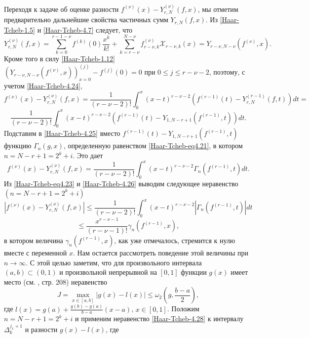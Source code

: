     Переходя к задаче об оценке разности $f^{(\nu)}(x)-Y_{r,N}^{(\nu)}(f,x)$, мы отметим предварительно  дальнейшие свойства    частичных сумм $Y_{r,N}(f,x)$. Из \eqref{Haar-Tcheb-1.5} и  \eqref{Haar-Tcheb-4.7} следует, что
\begin{equation}\label{Haar-Tcheb-4.24}
 Y_{r,N}^{(\nu)}(f,x)=\sum_{k=0}^{r-1-\nu} f^{(k)}(0)\frac{x^k}{k!}+ \sum_{k=r-\nu}^{N-\nu} f_{r-\nu,k}^{(\nu)}\mathcal{X}_{r-\nu,k}(x)=Y_{r-\nu,N-\nu}(f^{(\nu)},x).
 \end{equation}
 Кроме того в силу \eqref{Haar-Tcheb-1.12} $(Y_{r-\nu,N-\nu}(f^{(\nu)},x))^{(j)}_{x=0}-f^{(j)}(0)=0$ при  $0\le j\le r-\nu-2$,
 поэтому, с учетом \eqref{Haar-Tcheb-4.24},
 $$
f^{(\nu)}(x)-Y_{r,N}^{(\nu)}(f,x)= \frac{1}{(r-\nu-2)!}\int_0^x (x-t)^{r-\nu-2}(f^{(r-1)}(t)-Y_{r,N}^{(r-1)}(f,t))dt=
$$
  \begin{equation}\label{Haar-Tcheb-4.25}
\frac{1}{(r-\nu-2)!}\int_0^x (x-t)^{r-\nu-2}(f^{(r-1)}(t)-Y_{1,N-r+1}(f^{(r-1)},t))dt.
 \end{equation}
Подставим в \eqref{Haar-Tcheb-4.25} вместо $f^{(r-1)}(t)-Y_{1,N-r+1}(f^{(r-1)},t)$  функцию $\Gamma_n(g,x)$, определенную равенством \eqref{Haar-Tcheb-eq4.21}, в котором $n=N-r+1=2^k+i$.  Это дает
 \begin{equation}\label{Haar-Tcheb-4.26}
f^{(\nu)}(x)-Y_{r,N}^{(\nu)}(f,x)=\frac{1}{(r-\nu-2)!}\int_0^x (x-t)^{r-\nu-2}\Gamma_n(f^{(r-1)},t)dt.
 \end{equation}
Из \eqref{Haar-Tcheb-eq4.23} и \eqref{Haar-Tcheb-4.26} выводим следующее неравенство $(n=N-r+1=2^k+i)$
$$
|f^{(\nu)}(x)-Y_{r,N}^{(\nu)}(f,x)|\le \frac{1}{(r-\nu-2)!}\int_0^x (x-t)^{r-\nu-2}|\Gamma_n(f^{(r-1)},t)|dt
$$
\begin{equation}\label{Haar-Tcheb-4.27}
\le\frac{x^{r-\nu-1}}{(r-\nu-1)!}\gamma_n(f^{(r-1)},x),
 \end{equation}
в котором  величина $\gamma_n(f^{(r-1)},x)$,   как уже отмечалось, стремится к нулю вместе с переменной  $x$. Нам остается рассмотреть поведение этой величины при $n\to\infty$.
С этой целью заметим, что для произвольного интервала $(a,b)\subset(0,1)$ и произвольной непрерывной на $[0,1]$ функции $g(x)$ имеет место (см. \cite{Haar-Tcheb-KashSaak}, стр. 208)  неравенство
\begin{equation}\label{Haar-Tcheb-4.28}
J=\max_{x\in[a,b]}|g(x)-l(x)|\le\omega_2\left(g,\frac{b-a}{2}\right),
\end{equation}
где $l(x)=g(a)+\frac{g(b)-g(a)}{b-a}(x-a)$, $x\in[0,1]$. Положим $n=N-r+1=2^k+i$ и применим неравенство \eqref{Haar-Tcheb-4.28}
к интервалу $\Delta_k^{j_x+1}$ и разности $g(x)-l(x)$, где

